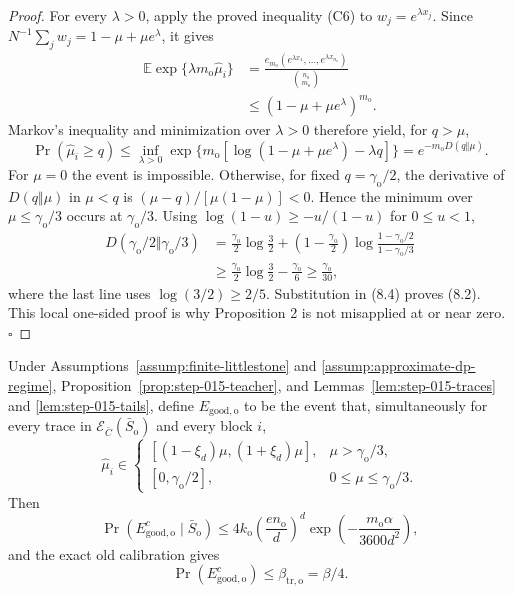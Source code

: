 \begin{proof}
For every \(\lambda>0\), apply the proved inequality (C6) to
\(w_j=e^{\lambda x_j}\). Since
\(N^{-1}\sum_jw_j=1-\mu+\mu e^\lambda\), it gives
\[
\begin{aligned}
\mathbb E\exp\{\lambda m_{\mathrm o}\widehat\mu_i\}
&=\frac{e_{m_{\mathrm o}}
(e^{\lambda x_1},\ldots,e^{\lambda x_{n_{\mathrm o}}})}
{\binom{n_{\mathrm o}}{m_{\mathrm o}}}\\
&\le(1-\mu+\mu e^\lambda)^{m_{\mathrm o}}.
\end{aligned}
\tag{8.3}
\]
Markov's inequality and minimization over \(\lambda>0\) therefore yield,
for \(q>\mu\),
\[
\Pr(\widehat\mu_i\ge q)
\le\inf_{\lambda>0}
\exp\{m_{\mathrm o}[\log(1-\mu+\mu e^\lambda)-\lambda q]\}
=e^{-m_{\mathrm o}D(q\Vert\mu)}.
\tag{8.4}
\]
For \(\mu=0\) the event is impossible. Otherwise, for fixed
\(q=\gamma_{\mathrm o}/2\), the derivative of
\(D(q\Vert\mu)\) in \(\mu<q\) is
\((\mu-q)/[\mu(1-\mu)]<0\). Hence the minimum over
\(\mu\le\gamma_{\mathrm o}/3\) occurs at \(\gamma_{\mathrm o}/3\).
Using \(\log(1-u)\ge-u/(1-u)\) for \(0\le u<1\),
\[
\begin{aligned}
D(\gamma_{\mathrm o}/2\Vert\gamma_{\mathrm o}/3)
&=\frac{\gamma_{\mathrm o}}2\log\frac32
+\left(1-\frac{\gamma_{\mathrm o}}2\right)
\log\frac{1-\gamma_{\mathrm o}/2}{1-\gamma_{\mathrm o}/3}\\
&\ge\frac{\gamma_{\mathrm o}}2\log\frac32
-\frac{\gamma_{\mathrm o}}6
\ge\frac{\gamma_{\mathrm o}}{30},
\end{aligned}
\tag{8.5}
\]
where the last line uses \(\log(3/2)\ge2/5\). Substitution in (8.4)
proves (8.2). This local one-sided proof is why Proposition 2 is not
misapplied at or near zero. \(\square\)


\end{proof}

\begin{proposition}\label{prop:step-015-good}
Under Assumptions~\ref{assump:finite-littlestone} and
\ref{assump:approximate-dp-regime},
Proposition~\ref{prop:step-015-teacher}, and
Lemmas~\ref{lem:step-015-traces} and \ref{lem:step-015-tails}, define
\(E_{\mathrm{good,o}}\) to be the event that, simultaneously for every
trace in \(\mathcal E_{\bar C}(\bar S_{\mathrm o})\) and every block \(i\),
\[
\widehat\mu_i\in
\begin{cases}
[(1-\xi_d)\mu,(1+\xi_d)\mu],
&\mu>\gamma_{\mathrm o}/3,\\
[0,\gamma_{\mathrm o}/2],
&0\le\mu\le\gamma_{\mathrm o}/3.
\end{cases}
\tag{9.1}
\]
Then
\[
\Pr(E_{\mathrm{good,o}}^c\mid\bar S_{\mathrm o})
\le4k_{\mathrm o}
\left(\frac{en_{\mathrm o}}d\right)^d
\exp\!\left(-\frac{m_{\mathrm o}\alpha}{3600d^2}\right),
\tag{9.2}
\]
and the exact old calibration gives
\[
\Pr(E_{\mathrm{good,o}}^c)\le\beta_{\mathrm{tr,o}}=\beta/4.
\tag{9.3}
\]


\end{proposition}


